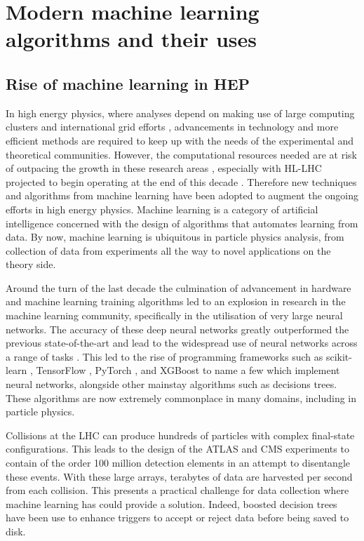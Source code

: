\documentclass[main.tex]{subfiles}
\begin{document}
\chapter{Modern machine learning algorithms and their uses}
\label{chapter:ml}
\section{Rise of machine learning in HEP}
    In high energy physics, where analyses
    depend on making use of large computing clusters
    and international grid efforts \cite{WLCG}, advancements
    in technology and more efficient methods are
    required to keep up with the needs of the
    experimental and theoretical communities.
    However, the computational resources needed
    are at risk of outpacing the growth in these research
    areas \cite{Bothmann:2022thx}, especially with
    HL-LHC projected to begin operating at the end
    of this decade \cite{ZurbanoFernandez:2020cco}.
    Therefore new techniques and
    algorithms from machine learning 
    have been adopted to augment the ongoing efforts
    in high energy physics. Machine
    learning is a category of artificial intelligence
    concerned with the design of algorithms that
    automates learning from data.
    By now, machine learning is ubiquitous in
    particle physics analysis, from collection
    of data from experiments all the way to novel
    applications on the theory side.

    Around the turn of the last decade the culmination
    of advancement in hardware and machine learning training algorithms
    led to an explosion in research in the
    machine learning community, specifically in the
    utilisation of very large neural networks. The accuracy
    of these deep neural networks greatly outperformed the
    previous state-of-the-art \cite{NIPS2012_c399862d,russakovsky2015imagenet} and
    lead to the widespread use of neural networks across
    a range of tasks \cite{Schmidhuber_2015}.
    This led to the rise of programming
    frameworks such as scikit-learn \cite{scikit-learn},
    TensorFlow \cite{tensorflow2015-whitepaper},
    PyTorch \cite{paszke2019pytorch},
    and XGBoost \cite{Chen:2016:XST:2939672.2939785}
    to name a few which implement neural networks, alongside
    other mainstay algorithms such as decisions trees.
    These algorithms are now extremely commonplace
    in many domains, including in particle physics. 

    Collisions at the LHC can produce hundreds of
    particles with complex final-state configurations.
    This leads to the design of the ATLAS and CMS experiments
    to contain of the order 100 million detection elements
    in an attempt to disentangle these events. With these large
    arrays, terabytes of data are harvested per second from
    each collision. This presents a practical challenge for data
    collection where machine learning has could provide a solution.
    Indeed, boosted decision trees have been use
    to enhance triggers \cite{CMS:2020cmk} to accept or
    reject data before being saved to disk.
\end{document}

